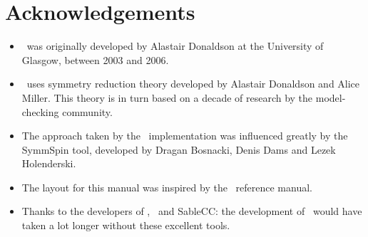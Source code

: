 \chapter*{Acknowledgements}

\begin{itemize}
\item \topspin\ was originally developed by Alastair Donaldson at the University of Glasgow, between 2003 and 2006.
\item \topspin\ uses symmetry reduction theory developed by Alastair Donaldson and Alice Miller.  This theory is
in turn based on a decade of research by the model-checking
community.
\item The approach taken by the \topspin\ implementation was influenced greatly by the SymmSpin tool, developed
by Dragan Bosnacki, Denis Dams and Lezek Holenderski.
\item The layout for this manual was inspired by the \gap\ reference manual.
\item Thanks to the developers of \gap, \saucy\ and SableCC: the development of \topspin\ would have taken a lot
longer without these excellent tools.
\end{itemize}
